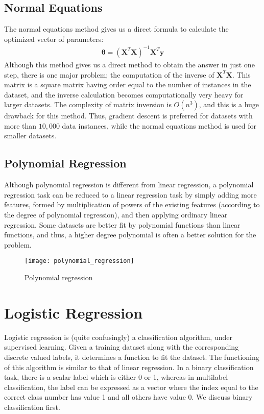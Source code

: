 \documentclass[a4paper, 12pt]{article}
\begin{document}
\subsection{Normal Equations}
The normal equations method gives us a direct formula to calculate the optimized vector of parameters:
\begin{align*}
\bm{\theta} = \left(\bm{X}^T\bm{X}\right)^{-1}\bm{X}^T\bm{y}
\end{align*}
Although this method gives us a direct method to obtain the answer in just one step, there is one major problem; the computation of the inverse of $\bm{X}^T\bm{X}$. This matrix is a square matrix having order equal to the number of instances in the dataset, and the inverse calculation becomes computationally very heavy for larger datasets. The complexity of matrix inversion is $O(n^3)$, and this is a huge drawback for this method. Thus, gradient descent is preferred for datasets with more than $10,000$ data instances, while the normal equations method is used for smaller datasets.

\subsection{Polynomial Regression}
Although polynomial regression is different from linear regression, a polynomial regression task can be reduced to a linear regression task by simply adding more features, formed by multiplication of powers of the existing features (according to the degree of polynomial regression), and then applying ordinary linear regression. Some datasets are better fit by polynomial functions than linear functions, and thus, a higher degree polynomial is often a better solution for the problem.
\begin{figure}[H]
\centering
\texttt{[image: polynomial\_regression]}
\caption{Polynomial regression}
\end{figure}


\section{Logistic Regression}
Logistic regression is (quite confusingly) a classification algorithm, under supervised learning. Given a training dataset along with the corresponding discrete valued labels, it determines a function to fit the dataset. The functioning of this algorithm is similar to that of linear regression. In a binary classification task, there is a scalar label which is either 0 or 1, whereas in multilabel classification, the label can be expressed as a vector where the index equal to the correct class number has value 1 and all others have value 0. We discuss binary classification first.
\end{document}
